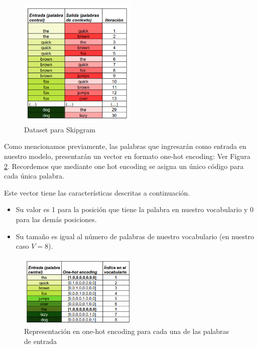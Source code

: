 \documentclass[12pt,a4paper]{article}
\begin{document}
\begin{sloppypar}
\begin{figure}[H]    %
\centering
\includegraphics[width=0.5\textwidth]{images/Ejemplo_Skipgram/2_EjSkip.png}
\caption{Dataset para Skipgram} 
\label{fig:2_EjSkip}
\end{figure}

\cleardoublepage

Como mencionamos previamente, las palabras que ingresarán como entrada en nuestro modelo, presentarán un vector en formato one-hot encoding: Ver Figura \ref{fig:3_EjSkip}. Recordemos que mediante one hot encoding se asigna un único código para cada única palabra. 

Este vector tiene las características descritas a continuación.
\begin{itemize}
\item Su valor es 1 para la posición que tiene la palabra en nuestro vocabulario y 0 para las demás posiciones.
\item Su tamaño es igual al número de palabras de nuestro vocabulario (en nuestro caso $V = 8$). 
\end{itemize}

\begin{figure}[H]    %
\centering
\includegraphics[width=0.5\textwidth]{images/Ejemplo_Skipgram/3_EjSkip.png}
 \captionsetup{justification=centering,margin=3cm}
\caption{Representación en one-hot encoding para cada una de las palabras de entrada} 
\label{fig:3_EjSkip}
\end{figure}


\end{sloppypar}
\end{document}
